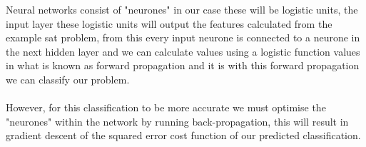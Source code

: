 \documentclass[12pt,a4paper]{article}
\def\layersep{2.5cm}
\begin{document}
Neural networks consist of "neurones" in our case these will be logistic units, the input layer these logistic units will output the features calculated from the example sat problem, from this every input neurone is connected to a neurone in the next hidden layer and we can calculate values using a logistic function values in what is known as forward propagation and it is with this forward propagation we can classify our problem.\\\\
However, for this classification to be more accurate we must optimise the "neurones" within the network by running back-propagation, this will result in gradient descent of the squared error cost function of our predicted classification.\\\\
\begin{center}
\end{center}
\end{document}
